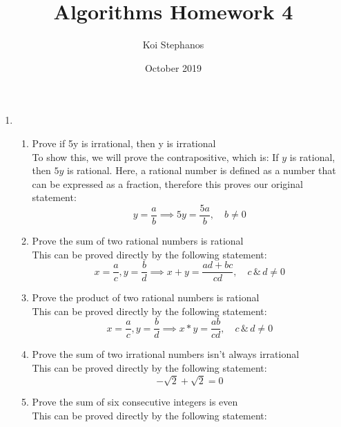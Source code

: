 \documentclass{article}
\title{Algorithms Homework 4}
\author{Koi Stephanos}
\date{October 2019}
\begin{document}
\maketitle

\begin{enumerate}
\item
    \begin{enumerate}[label=(\alph*)]
        \item Prove if 5y is irrational, then y is irrational
        \\[\medskipamount]
        To show this, we will prove the contrapositive, which is: If \(y\) is rational, then \(5y\) is rational. Here, a rational number is defined as a number that can be expressed as a fraction, therefore this proves our original statement:
        \begin{equation}
            y = \frac{a}{b} \implies 5y = \frac{5a}{b},\quad b \neq 0
        \end{equation}
        \item Prove the sum of two rational numbers is rational
        \\[\medskipamount]
        This can be proved directly by the following statement:
        \begin{equation}
            x = \frac{a}{c}, y = \frac{b}{d} \implies x + y = \frac{ad + bc}{cd},\quad c \,\&\, d \neq 0
        \end{equation}
        \item Prove the product of two rational numbers is rational
        \\[\medskipamount]
        This can be proved directly by the following statement:
        \begin{equation}
            x = \frac{a}{c}, y = \frac{b}{d} \implies x * y = \frac{ab}{cd},\quad c \,\&\, d \neq 0
        \end{equation}
        \item Prove the sum of two irrational numbers isn't always irrational
        \\[\medskipamount]
        This can be proved directly by the following statement:
        \begin{equation}
            -\sqrt{2} + \sqrt{2} = 0
        \end{equation}
        \item Prove the sum of six consecutive integers is even
        \\[\medskipamount]
        This can be proved directly by the following statement:
        \begin{equation}

\end{equation}
\end{enumerate}
\end{enumerate}
\end{document}

